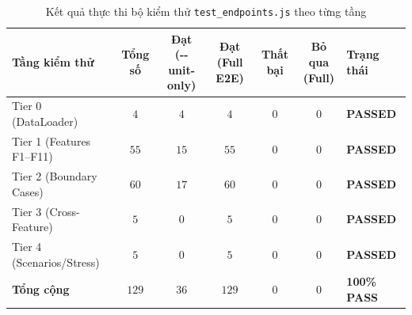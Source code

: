 \begin{table}[H]
	\centering
	\footnotesize
	\setlength{\tabcolsep}{5pt}
	\begin{tabular}{l c c c c c l}
		\toprule
		\textbf{Tầng kiểm thử}    & \textbf{Tổng số} & \makecell[r]{\textbf{Đạt}\\\textbf{(-{}-unit-only)}} & \makecell[r]{\textbf{Đạt}\\\textbf{(Full E2E)}} & \textbf{Thất bại} & \makecell[r]{\textbf{Bỏ qua}\\\textbf{(Full)}} & \textbf{Trạng thái} \\
		\midrule
		Tier 0 (DataLoader)       & $4$              & $4$                                                  & $4$                                             & $0$               & $0$                                            & \textbf{PASSED}     \\
		Tier 1 (Features F1--F11) & $55$             & $15$                                                 & $55$                                            & $0$               & $0$                                            & \textbf{PASSED}     \\
		Tier 2 (Boundary Cases)   & $60$             & $17$                                                 & $60$                                            & $0$               & $0$                                            & \textbf{PASSED}     \\
		Tier 3 (Cross-Feature)    & $5$              & $0$                                                  & $5$                                             & $0$               & $0$                                            & \textbf{PASSED}     \\
		Tier 4 (Scenarios/Stress) & $5$              & $0$                                                  & $5$                                             & $0$               & $0$                                            & \textbf{PASSED}     \\
		\midrule
		\textbf{Tổng cộng}        & \textbf{$129$}   & \textbf{$36$}                                        & \textbf{$129$}                                  & \textbf{$0$}      & \textbf{$0$}                                   & \textbf{100\% PASS} \\
		\bottomrule
	\end{tabular}
	\caption{Kết quả thực thi bộ kiểm thử \texttt{test\_endpoints.js} theo từng tầng}
	\label{tab:test-results}
\end{table}

